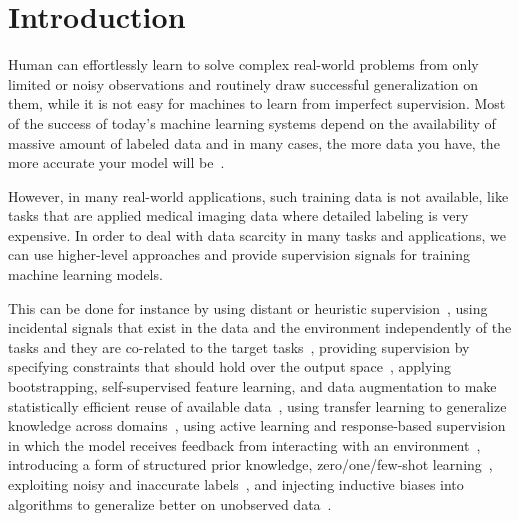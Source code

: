 \chapter{Introduction}
Human can effortlessly learn to solve complex real-world problems from only limited or noisy observations and routinely draw successful generalization on them, while it is not easy for machines to learn from imperfect supervision.
Most of the success of today's machine learning systems depend on the availability of massive amount of labeled data and in many cases, the more data you have, the more accurate your model will be~\citep{halevy2009unreasonable,sun2017revisiting}. 

However, in many real-world applications, such training data is not available, like tasks that are applied medical imaging data where detailed labeling is very expensive. In order to deal with data scarcity in many tasks and applications, we can use higher-level approaches and provide supervision signals for training machine learning models. 

This can be done for instance by
using distant or heuristic supervision~\citep{Deriu2016:SemEval,Severyn:2015:SemEval, Dehghani:2016:SIGIR, dehghani:2018:ICLR, Dehghani:2017:nips_metalearn, Ratner:2016,Rekatsinas:2017,Varma:2017}, 
%
using incidental signals that exist in the data and the environment independently of the tasks and they are co-related to the target tasks~\citep{roth2017incidental}, 
%
providing supervision by specifying constraints that should hold over the output space~\citep{stewart2017label, clarke2010driving}, 
%
applying bootstrapping, self-supervised feature learning, and data augmentation to make statistically efficient reuse of available data~\citep{cubuk2018autoaugment, dosovitskiy2016discriminative,donahue2016adversarial},
%
using transfer learning to generalize knowledge across domains~\citep{Ruder:2019},
%
using active learning and response-based supervision in which the model receives feedback from interacting with an environment~\citep{clarke2010driving,riezler2014response},
%
introducing a form of structured prior knowledge\citep{Dehghani:CIKM2016:long,Dehghani:2016:ICTIR}, 
%
zero/one/few-shot learning~\citep{vinyals2016matching,finn2017model,snell2017prototypical,socher2013zero},
%
exploiting noisy and inaccurate labels~\citep{Vahdat:2017, Lee:2013,Hinton:2015,Brodley:1999,reed2014training, Patrini:2016, patrini2016loss,malach2017decoupling}, 
%
and injecting inductive biases into algorithms to generalize better on unobserved data~\citep{cohen2016group, cohen2016steerable, Dehghani:ICLR:2019}.

